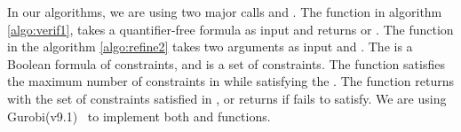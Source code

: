 In our algorithms, we are using two major calls \checksat{} and \maxsat{}.
The function \checksat{} in algorithm \ref{algo:verif1}, 
takes a quantifier-free formula as input and returns \sat{} or \unsat{}. 
The function \maxsat{} in the algorithm \ref{algo:refine2} takes
two arguments as input \hardconstr{} and \softconstr{}. 
The \hardconstr{} is a Boolean formula of constraints,
and \softconstr{} is a set of constraints. 
The function \maxsat{} satisfies the maximum number of constraints
in \softconstr{} while satisfying the \hardconstr{}. 
The function \maxsat{} returns \sat{} with the set of
constraints satisfied in \softconstr{}, or returns
\unsat{} if \hardconstr{} fails to satisfy.
We are using Gurobi(v9.1)~\cite{gurobioptimizer} to implement 
both \checksat{} and \maxsat{} functions. 





